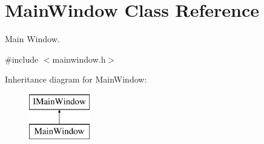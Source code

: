 \hypertarget{class_main_window}{\section{\-Main\-Window \-Class \-Reference}
\label{class_main_window}
}


\-Main \-Window.  




{\ttfamily \#include $<$mainwindow.\-h$>$}

\-Inheritance diagram for \-Main\-Window\-:\begin{figure}[H]
\begin{center}
\leavevmode
\includegraphics[height=2.000000cm]{class_main_window}
\end{center}
\end{figure}
